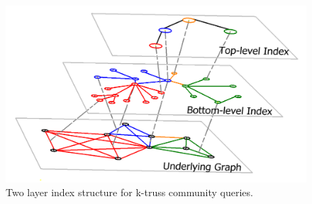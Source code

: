 \begin{figure}[ht]
    \centering
    \includegraphics[width=0.8\linewidth]{./figures/illustration_main.png}
    \caption{Two layer index structure for k-truss community queries.}
    \label{fig:illustration_main}
		\vspace{-0.2 in}
\end{figure}

